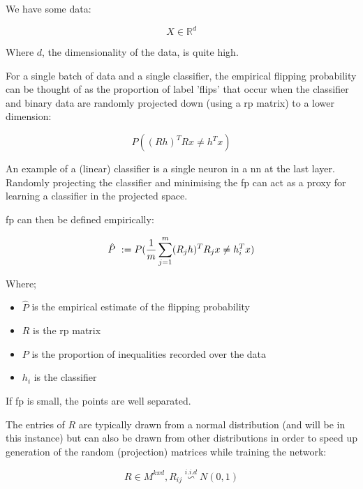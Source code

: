 We have some data:

\begin{equation}
X \in \mathds{R}^d 
\end{equation}

Where $d$, the dimensionality of the data, is quite high. \bigskip

For a single batch of data and a single classifier, the empirical flipping probability can be thought of as the proportion of label 'flips' that occur when the classifier and binary data are randomly projected down (using a \gls{rp} matrix) to a lower dimension:

\begin{equation}
P((R h)^T Rx \neq h^{T}x)  
\end{equation}

An example of a (linear) classifier is a single neuron in a \gls{nn} at the last layer. Randomly projecting the classifier and minimising the \gls{fp} can act as a proxy for learning a classifier in the projected space. \smallskip

\gls{fp} can then be defined empirically:

\begin{equation}
\hat{P}\ := \\ P(\frac{1}{m}\sum_{j = 1}^m (R_j h)^T R_{j}x \neq h_i^{T}x)  
\end{equation}

Where;  \smallskip

\begin{itemize}
\item $\hat{P}$ is the empirical estimate of the flipping probability  
\item $R$ is the \gls{rp} matrix  
\item $P$ is the proportion of inequalities recorded over the data 
\item $h_i$ is the classifier  
\end{itemize}

If  \gls{fp} is small, the points are well separated. \bigskip

The entries of $R$ are typically drawn from a normal distribution (and will be in this instance) but can also be drawn from other distributions in order to speed up generation of the random (projection) matrices while training the network:

\begin{equation}
R \in M^{kxd}, R_{ij} \stackrel{i.i.d}{\backsim} N(0,1) 
\end{equation}

